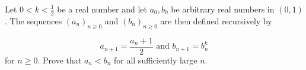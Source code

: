 Let $0<k<\frac{1}{2}$ be a real number and let $a_0, b_0$ be arbitrary real numbers in $(0,1)$. The sequences $(a_n)_{n\ge 0}$ and $(b_n)_{n\ge 0}$ are then defined recursively by

$$a_{n+1} = \dfrac{a_n+1}{2} \text{ and } b_{n+1} = b_n^k$$
for $n\ge 0$. Prove that $a_n<b_n$ for all sufficiently large $n$.

